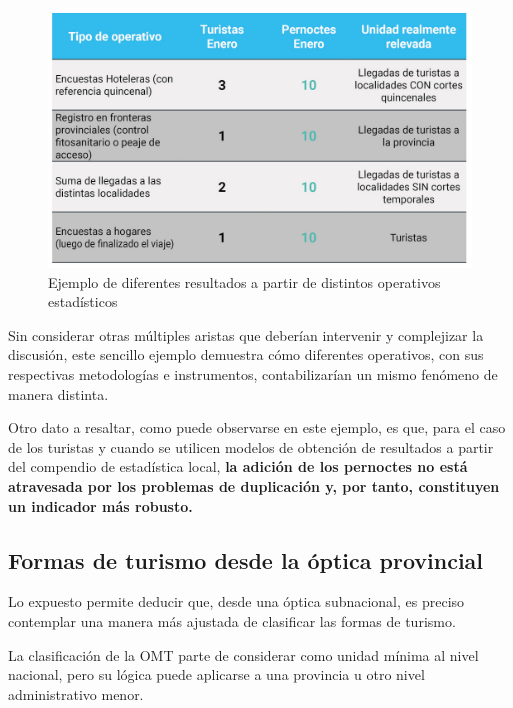 \documentclass[
  openany]{book}
\begin{document}
\begin{figure}

{\centering \includegraphics[width=1\linewidth]{imagenes/figura1.5} 

}

\caption{Ejemplo de diferentes resultados a partir de distintos operativos estadísticos}\label{fig:operativos}
\end{figure}

Sin considerar otras múltiples aristas que deberían intervenir y complejizar la discusión, este sencillo ejemplo demuestra cómo diferentes operativos, con sus respectivas metodologías e instrumentos, contabilizarían un mismo fenómeno de manera distinta.

Otro dato a resaltar, como puede observarse en este ejemplo, es que, para el caso de los turistas y cuando se utilicen modelos de obtención de resultados a partir del compendio de estadística local, \textbf{la adición de los pernoctes no está atravesada por los problemas de duplicación y, por tanto, constituyen un indicador más robusto.}

\hypertarget{formas-de-turismo-desde-la-uxf3ptica-provincial}{%
\subsection{Formas de turismo desde la óptica provincial}\label{formas-de-turismo-desde-la-uxf3ptica-provincial}}

Lo expuesto permite deducir que, desde una óptica subnacional, es preciso contemplar una manera más ajustada de clasificar las formas de turismo.

La clasificación de la OMT parte de considerar como unidad mínima al nivel nacional, pero su lógica puede aplicarse a una provincia u otro nivel administrativo menor.
\end{document}
